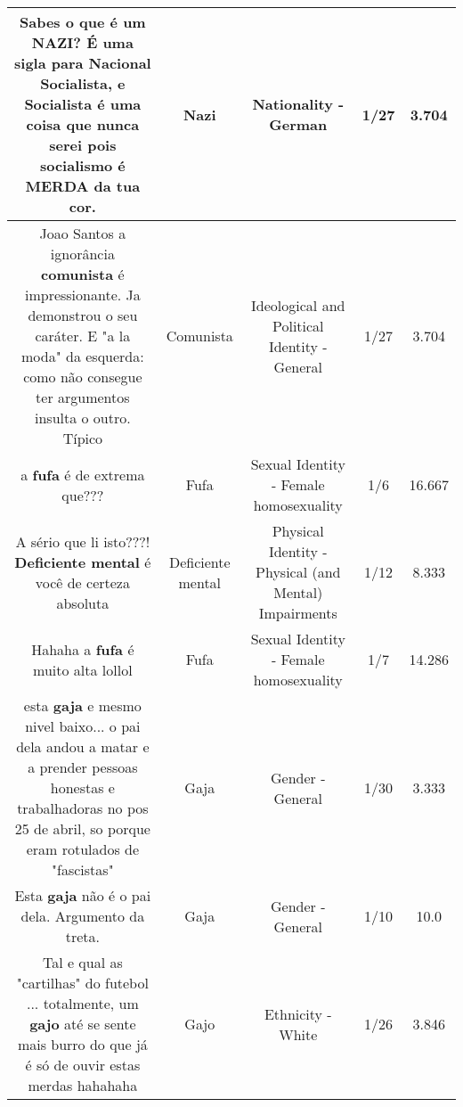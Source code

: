 \documentclass[11pt]{article}
\newlength\mylength
\begin{document}
\begin{center}
\begin{longtable}{|C{.65\mylength}|C{.30\mylength}|C{.12\mylength}|C{.12\mylength}|C{.12\mylength}|}
  \small Sabes o que é um \textbf{NAZI}? É uma sigla para Nacional Socialista, e Socialista é uma coisa que nunca serei pois socialismo é MERDA da tua cor.\normalsize   & Nazi & Nationality - German & 1/27 & 3.704 \\  \hline
  \small Joao Santos a ignorância \textbf{comunista} é impressionante. Ja demonstrou o seu caráter. E "a la moda" da esquerda: como não consegue ter argumentos insulta o outro. Típico\normalsize   & Comunista & Ideological and Political Identity - General & 1/27 & 3.704 \\  \hline
  \small a \textbf{fufa}  é de extrema que???\normalsize   & Fufa & Sexual Identity - Female homosexuality & 1/6 & 16.667 \\  \hline
  \small A sério que li isto???!  \textbf{Deficiente mental} é você de certeza absoluta\normalsize   & Deficiente mental & Physical Identity - Physical (and Mental) Impairments & 1/12 & 8.333 \\  \hline
  \small Hahaha a \textbf{fufa} é muito alta lollol\normalsize   & Fufa & Sexual Identity - Female homosexuality & 1/7 & 14.286 \\  \hline
  \small esta \textbf{gaja} e mesmo nivel baixo... o pai dela andou a matar e a prender pessoas honestas e trabalhadoras no pos 25 de abril, so porque eram rotulados de "fascistas"\normalsize   & Gaja & Gender - General & 1/30 & 3.333 \\  \hline
  \small Esta \textbf{gaja} não é o pai dela. Argumento da treta.\normalsize   & Gaja & Gender - General & 1/10 & 10.0 \\  \hline
  \small Tal e qual as "cartilhas" do futebol ... totalmente, um \textbf{gajo} até se sente mais burro do que já é só de ouvir estas merdas hahahaha\normalsize   & Gajo & Ethnicity - White & 1/26 & 3.846 \\  \hline

\end{longtable}
\end{center}
\end{document}
